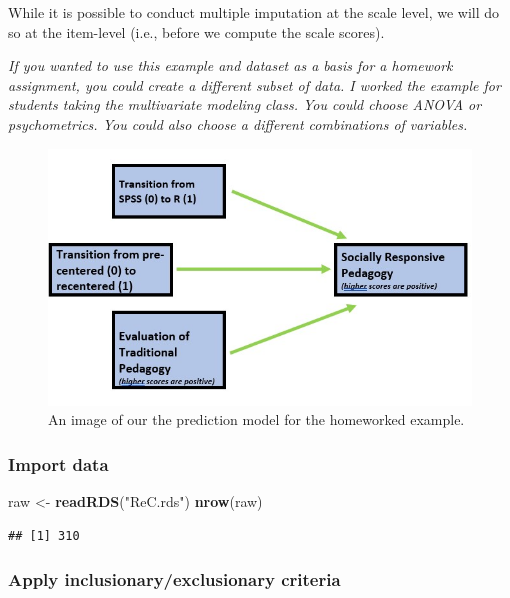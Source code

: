 \documentclass[
  11pt,
]{book}
\newenvironment{Shaded}{\begin{snugshade}}{\end{snugshade}}
\newcommand{\FunctionTok}[1]{\textcolor[rgb]{0.27,0.27,0.27}{\textbf{#1}}}
\newcommand{\NormalTok}[1]{#1}
\newcommand{\OtherTok}[1]{\textcolor[rgb]{0.37,0.37,0.37}{#1}}
\newcommand{\StringTok}[1]{\textcolor[rgb]{0.5,0.5,0.5}{#1}}
\begin{document}
While it is possible to conduct multiple imputation at the scale level, we will do so at the item-level (i.e., before we compute the scale scores).

\emph{If you wanted to use this example and dataset as a basis for a homework assignment, you could create a different subset of data. I worked the example for students taking the multivariate modeling class. You could choose ANOVA or psychometrics. You could also choose a different combinations of variables.}

\begin{figure}
\centering
\includegraphics{Worked_Examples/images/homeworked_model.jpg}
\caption{An image of our the prediction model for the homeworked example.}
\end{figure}

\hypertarget{import-data-1}{%
\subsubsection*{Import data}\label{import-data-1}}


\begin{Shaded}
\begin{Highlighting}[]
\NormalTok{raw }\OtherTok{\textless{}{-}} \FunctionTok{readRDS}\NormalTok{(}\StringTok{"ReC.rds"}\NormalTok{)}
\FunctionTok{nrow}\NormalTok{(raw)}
\end{Highlighting}
\end{Shaded}

\begin{verbatim}
## [1] 310
\end{verbatim}

\hypertarget{apply-inclusionaryexclusionary-criteria}{%
\subsubsection*{Apply inclusionary/exclusionary criteria}\label{apply-inclusionaryexclusionary-criteria}}
\end{document}
